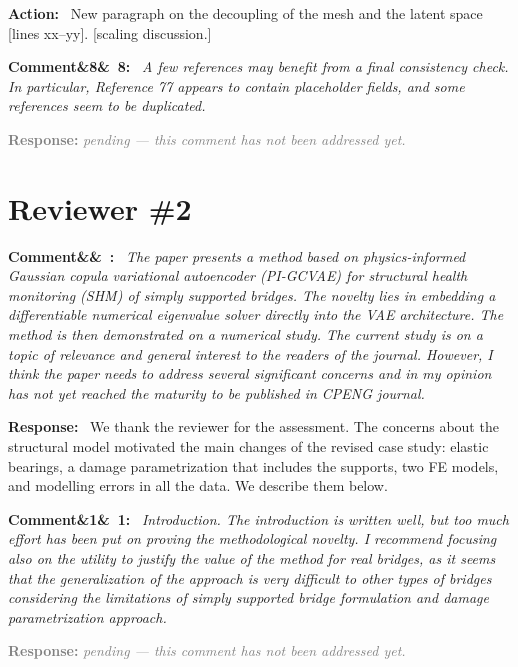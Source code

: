 \documentclass[11pt]{article}
\newenvironment{rcomment}[1]{\par\bigskip\noindent\textbf{Comment\ifx&#1&\else\ #1\fi:}\ \itshape}{\par}
\newenvironment{response}{\par\smallskip\noindent\color{resp}\textbf{Response:}\ }{\par}
\newenvironment{action}{\par\smallskip\noindent\color{resp}\textbf{Action:}\ }{\par}
\newcommand{\pending}{\par\smallskip\noindent\textcolor{gray}{\textbf{Response:} \textit{pending --- this comment
has not been addressed yet.}}\par}
\newcommand{\tbd}[1]{\textcolor{note}{\textsf{[#1]}}}
\newcommand{\lines}[1]{\tbd{lines #1}}
\begin{document}
\begin{action}
New paragraph on the decoupling of the mesh and the latent space \lines{xx--yy}. \tbd{scaling discussion.}
\end{action}

\begin{rcomment}{8}
A few references may benefit from a final consistency check. In particular, Reference 77 appears to contain placeholder
fields, and some references seem to be duplicated.
\end{rcomment}
\pending

\section{Reviewer \#2}

\begin{rcomment}{}
The paper presents a method based on physics-informed Gaussian copula variational autoencoder (PI-GCVAE) for
structural health monitoring (SHM) of simply supported bridges. The novelty lies in embedding a differentiable numerical
eigenvalue solver directly into the VAE architecture. The method is then demonstrated on a numerical study. The current
study is on a topic of relevance and general interest to the readers of the journal. However, I think the paper needs to
address several significant concerns and in my opinion has not yet reached the maturity to be published in CPENG
journal.
\end{rcomment}

\begin{response}
We thank the reviewer for the assessment. The concerns about the structural model motivated the main changes of the
revised case study: elastic bearings, a damage parametrization that includes the supports, two FE models, and modelling
errors in all the data. We describe them below.
\end{response}

\begin{rcomment}{1}
Introduction. The introduction is written well, but too much effort has been put on proving the methodological
novelty. I recommend focusing also on the utility to justify the value of the method for real bridges, as it seems that
the generalization of the approach is very difficult to other types of bridges considering the limitations of simply
supported bridge formulation and damage parametrization approach.
\end{rcomment}
\pending
\end{document}

